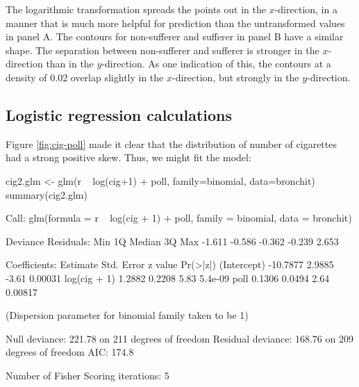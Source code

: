 \documentclass{tufte-book}\usepackage[]{graphicx}\usepackage[]{color}
\begin{document}
The logarithmic transformation spreads the points out in the
$x$-direction, in a manner that is much more helpful for prediction
than the untransformed values in panel A.  The contours for
non-sufferer and sufferer in panel B have a similar shape.  The
separation between non-sufferer and sufferer is stronger in the
$x$-direction than in the $y$-direction.  As one indication of this,
the contours at a density of 0.02 overlap slightly in the $x$-direction,
but strongly in the $y$-direction.

\subsection*{Logistic regression calculations}

Figure \ref{fig:cig-poll} made it clear
that the distribution of number of cigarettes had a strong positive
skew.  Thus, we might fit the model:
\begin{fullwidth}
\begin{Schunk}
\begin{Sinput}
cig2.glm <- glm(r ~ log(cig+1) + poll, family=binomial, data=bronchit)
summary(cig2.glm)
\end{Sinput}
\begin{Soutput}

Call:
glm(formula = r ~ log(cig + 1) + poll, family = binomial, data = bronchit)

Deviance Residuals: 
   Min      1Q  Median      3Q     Max  
-1.611  -0.586  -0.362  -0.239   2.653  

Coefficients:
             Estimate Std. Error z value Pr(>|z|)
(Intercept)  -10.7877     2.9885   -3.61  0.00031
log(cig + 1)   1.2882     0.2208    5.83  5.4e-09
poll           0.1306     0.0494    2.64  0.00817

(Dispersion parameter for binomial family taken to be 1)

    Null deviance: 221.78  on 211  degrees of freedom
Residual deviance: 168.76  on 209  degrees of freedom
AIC: 174.8

Number of Fisher Scoring iterations: 5
\end{Soutput}
\end{Schunk}
\end{fullwidth}
\end{document}

